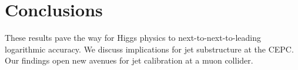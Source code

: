 \section{Conclusions}\label{sec:conclusions}

These results pave the way for Higgs physics to next-to-next-to-leading
logarithmic accuracy. We discuss implications for jet substructure at
the CEPC. Our findings open new avenues for jet calibration at a muon
collider.

